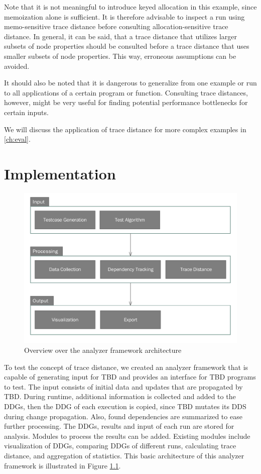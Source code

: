 Note that it is not meaningful to introduce keyed allocation in this example, since memoization alone is sufficient. It is therefore advisable to inspect a run using memo-sensitive trace distance before consulting allocation-sensitive trace distance. In general, it can be said, that a trace distance that utilizes larger subsets of node properties should be consulted before a trace distance that uses smaller subsets of node properties. This way, erroneous assumptions can be avoided.

It should also be noted that it is dangerous to generalize from one example or run to all applications of a certain program or function. Consulting trace distances, however, might be very useful for finding potential performance bottlenecks for certain inputs. 

We will discuss the application of trace distance for more complex examples in \ref{ch:eval}.

\chapter{Implementation}

\begin{figure}
\begin{center}
\includegraphics[scale=0.7]{uml/Framework.pdf}
\end{center}
\caption{Overview over the analyzer framework architecture}
\label{fig:testing_framework}
\end{figure}

To test the concept of trace distance, we created an analyzer framework that is capable of generating input for TBD and provides an interface for TBD programs to test. The input consists of initial data and updates that are propagated by TBD. During runtime, additional information is collected and added to the DDGs, then the DDG of each execution is copied, since TBD mutates its DDS during change propagation. Also, found dependencies are summarized to ease further processing. The DDGs, results and input of each run are stored for analysis. Modules to process the results can be added. Existing modules include visualization of DDGs, comparing DDGs of different runs, calculating trace distance, and aggregation of statistics. This basic architecture of this analyzer framework is illustrated in Figure \ref{fig:testing_framework}.

